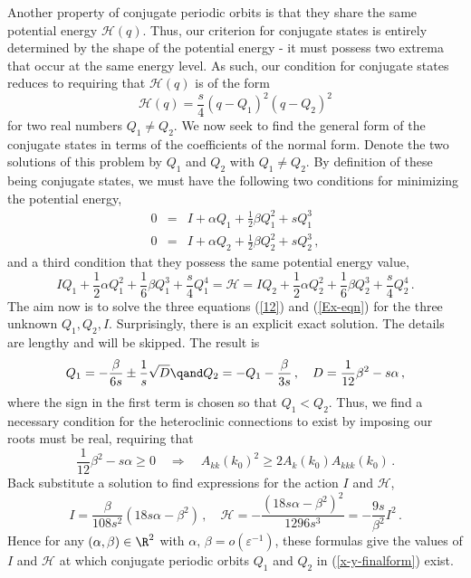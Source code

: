 \documentclass[10pt]{article}
\def\eps{{\varepsilon}} \def\reps{\textcolor{red}{{\varepsilon}}}
\begin{document}
Another property of conjugate periodic orbits is that they share the same potential energy $\mathcal{H}(q)$. Thus, our criterion for
conjugate states is entirely determined by the shape of the potential energy -
it must possess two extrema that occur at the same energy level. As such, our
condition for conjugate states reduces to requiring that $\mathcal{H}(q)$ is of
the form
%
\[
\mathcal{H}(q) = \frac{s}{4}(q-Q_1)^2(q-Q_2)^2
\]
%
for two real numbers $Q_1\neq Q_2$. We now seek to find the general form of the conjugate states in terms of the
coefficients of the normal form. Denote the two solutions of this problem by
$Q_1$ and $Q_2$ with $Q_1\neq Q_2$. By definition of these being conjugate
states, we must have the following two conditions for minimizing the potential
energy,
%
\begin{equation}\label{12}
\begin{array}{rcl}
0 &=& I + \alpha Q_1 + \frac{1}{2}\beta Q_1^2 + s Q_1^3\\[2mm]
0 &=& I + \alpha Q_2 + \frac{1}{2}\beta Q_2^2 + s Q_2^3\,,
\end{array}
\end{equation}
%
and a third condition that they possess the same potential energy value, 
%
\begin{equation}\label{Ex-eqn}
I Q_1 + \frac{1}{2}\alpha Q_1^2 + \frac{1}{6}\beta Q_1^3 + \frac{s}{4} Q_1^4 = \mathcal{H} =
I Q_2 + \frac{1}{2}\alpha Q_2^2 + \frac{1}{6}\beta Q_2^3 + \frac{s}{4} Q_2^4\,.
\end{equation}
%
The aim now is to solve the three equations (\ref{12}) and (\ref{Ex-eqn}) for
the three unknown $Q_1,Q_2,I$. Surprisingly, there is an explicit exact
solution. The details are lengthy and will be skipped.  The result is
%
\begin{equation}\label{x-y-finalform}
Q_{1} = - \frac{\beta}{6s} \pm \frac{1}{s} \sqrt{D}\qand Q_2 = - Q_1 -\frac{\beta}{3s}\,,
\quad D = \frac{1}{12}\beta^2 - s\alpha\,,
\end{equation}
%
where the sign in the first term is chosen so that $Q_1<Q_2$. Thus, we find a
necessary condition for the heteroclinic connections to exist by imposing our
roots must be real, requiring that
%
\begin{equation}\label{root-reality-cond}
\frac{1}{12}\beta^2-s\alpha \geq 0 \quad \Rightarrow \quad  A_{kk}(k_0)^2 \geq 2A_k(k_0)A_{kkk}(k_0)\,.
\end{equation}
%
Back substitute a solution to find expressions for the action $I$ and
$\mathcal{H}$,
%
\begin{equation}\label{I-alpha-beta}
I =   \frac{\beta}{108 s^2}\left( 18 s \alpha -  \beta^2\right)\,,\quad
\mathcal{H}=  -\frac{(18s\alpha - \beta^2)^2}{1296s^3} = -\frac{9s}{\beta^2}I^2\,.
\end{equation}
%
Hence for any $(\alpha,\beta)\in\R^2$ with $\alpha,\,\beta  = o(\eps^{-1})$,
these formulas give the values of $I$ and $\mathcal{H}$ at which conjugate
periodic orbits $Q_1$ and $Q_2$ in (\ref{x-y-finalform}) exist.
\end{document}
